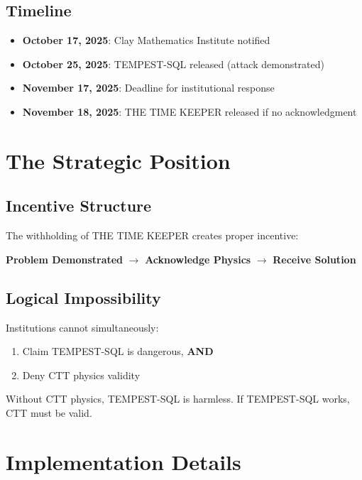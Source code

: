 \documentclass[11pt,a4paper]{article}
\begin{document}
\subsection{Timeline}

\begin{itemize}
    \item \textbf{October 17, 2025}: Clay Mathematics Institute notified
    \item \textbf{October 25, 2025}: TEMPEST-SQL released (attack demonstrated)
    \item \textbf{November 17, 2025}: Deadline for institutional response
    \item \textbf{November 18, 2025}: THE TIME KEEPER released if no acknowledgment
\end{itemize}

\section{The Strategic Position}

\subsection{Incentive Structure}

The withholding of THE TIME KEEPER creates proper incentive:

\begin{center}
\textbf{Problem Demonstrated} $\rightarrow$ \textbf{Acknowledge Physics} $\rightarrow$ \textbf{Receive Solution}
\end{center}

\subsection{Logical Impossibility}

Institutions cannot simultaneously:
\begin{enumerate}
    \item Claim TEMPEST-SQL is dangerous, \textbf{AND}
    \item Deny CTT physics validity
\end{enumerate}

Without CTT physics, TEMPEST-SQL is harmless. If TEMPEST-SQL works, CTT must be valid.

\section{Implementation Details}
\end{document}
